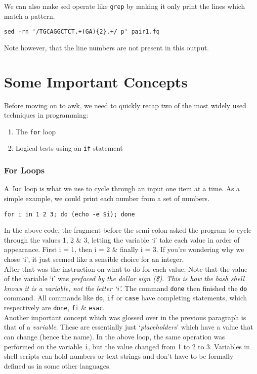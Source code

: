 \begin{steps}
We can also make sed operate like \texttt{grep} by making it only print the lines which match a pattern.
\begin{lstlisting}
sed -rn '/TGCAGGCTCT.+(GA){2}.+/ p' pair1.fq
\end{lstlisting}
Note however, that the line numbers are not present in this output.
\end{steps}

\section{Some Important Concepts}

Before moving on to awk, we need to quickly recap two of the most widely used techniques in programming:
\begin{enumerate}
  \item The \texttt{for} loop
  \item Logical tests using an \texttt{if} statement
\end{enumerate}

\subsubsection*{For Loops}

\begin{steps}
A \texttt{for} loop is what we use to cycle through an input one item at a time.
As a simple example, we could print each number from a set of numbers.
\begin{lstlisting}
for i in 1 2 3; do (echo -e $i); done
\end{lstlisting}
\end{steps}

\begin{information}
In the above code, the fragment before the semi-colon asked the program to cycle through the values 1, 2 \& 3, letting the variable `i' take each value in order of appearance.
First i = 1, then i = 2 \& finally i = 3.
If you're wondering why we chose `i', it just seemed like a sensible choice for an integer. \\

After that was the instruction on what to do for each value.
Note that the value of the variable `i' was \textit{prefaced by the dollar sign (\$).
This is how the bash shell knows it is a variable, not the letter `i'.}
The command \texttt{done} then finished the \texttt{do} command.
All commands like \texttt{do}, \texttt{if} or \texttt{case} have completing statements, which respectively are \texttt{done}, \texttt{fi} \& \texttt{esac}.\\

Another important concept which was glossed over in the previous paragraph is that of a \textit{variable}.
These are essentially just `\textit{placeholders}' which have a value that can change (hence the name).
In the above loop, the same operation was performed on the variable \texttt{i}, but the value changed from 1 to 2 to 3.
Variables in shell scripts can hold numbers or text strings and don't have to be formally defined as in some other languages.
\end{information}

